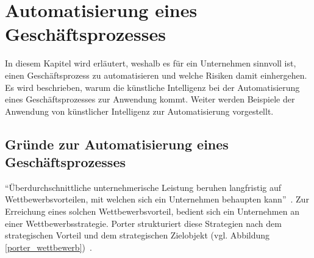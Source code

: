 \section{Automatisierung eines Geschäftsprozesses}
\label{chap:automation}

In diesem Kapitel wird erläutert, weshalb es für ein Unternehmen sinnvoll ist, einen Geschäftsprozess zu automatisieren und welche Risiken damit einhergehen. Es wird beschrieben, warum die künstliche Intelligenz bei der Automatisierung eines Geschäftsprozesses zur Anwendung kommt. Weiter werden Beispiele der Anwendung von künstlicher Intelligenz zur Automatisierung vorgestellt.

\subsection{Gründe zur Automatisierung eines Geschäftsprozesses}

\enquote{Überdurchschnittliche unternehmerische Leistung beruhen langfristig auf Wettbewerbsvorteilen, mit welchen sich ein Unternehmen behaupten kann}~\autocite[104]{Capaul2010}. Zur Erreichung eines solchen Wettbewerbsvorteil, bedient sich ein Unternehmen an einer Wettbewerbsstrategie. Porter strukturiert diese Strategien nach dem strategischen Vorteil und dem strategischen Zielobjekt (vgl. Abbildung \ref{porter_wettbewerb})~\autocite{Capaul2010}. 

